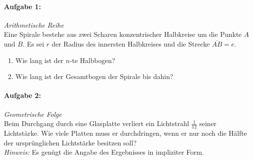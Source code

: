 
\paragraph{Aufgabe 1: } \emph{Arithmetische Reihe}\\[0.2cm]
Eine Spirale bestehe aus zwei Scharen konzentrischer Halbkreise um die Punkte $A$ und $B$. Es sei $r$ der Radius des innersten Halbkreises und die Strecke $\overline{AB}=e$.
\begin{enumerate}[label=(\alph*)]\setlength{\itemsep}{-0.5ex}
\item Wie lang ist der $n$-te Halbbogen?
\item Wie lang ist der Gesamtbogen der Spirale bis dahin?
\end{enumerate}
\begin{figure}[htp]
    \centering
    \vspace{-0.5cm}
\end{figure}
%
\paragraph{Aufgabe 2: } \emph{Geometrische Folge}\\[0.2cm]
Beim Durchgang durch eine Glasplatte verliert ein Lichtstrahl $\textstyle\frac{1}{12}$ seiner Lichtstärke. Wie viele Platten muss er durchdringen, wenn er nur noch die Hälfte der ursprünglichen Lichtstärke besitzen soll?\\[0.2cm]
\emph{Hinweis:} Es genügt die Angabe des Ergebnisses in impliziter Form.
%
